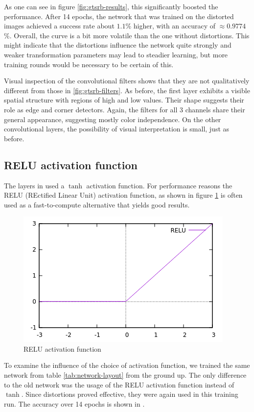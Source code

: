 \documentclass[11pt, a4paper]{article}
\begin{document}
As one can see in figure \ref{fig:gtsrb-results}, this significantly boosted the performance. After 14 epochs, the network that was trained on the distorted images achieved a success rate about $1.1$\% higher, with an accuracy of $\approx 0.9774$\%. Overall, the curve is a bit more volatile than the one without distortions. This might indicate that the distortions influence the network quite strongly and weaker transformation parameters may lead to steadier learning, but more training rounds would be necessary to be certain of this.

Visual inspection of the convolutional filters shows that they are not qualitatively different from those in \ref{fig:gtsrb-filters}. As before, the first layer exhibits a visible spatial structure with regions of high and low values. Their shape suggests their role as edge and corner detectors. Again, the filters for all 3 channels share their general appearance, suggesting mostly color independence. On the other convolutional layers, the possibility of visual interpretation is small, just as before.

\subsection{RELU activation function}
The layers in \cite{multi-column-neural-network-gtsrb} used a $\tanh$ activation function. For performance reasons the RELU (REctified Linear Unit) activation function, as shown in figure \ref{fig:relu} is often used as a fast-to-compute alternative that yields good results.

\begin{figure}[h!!!]
	\centering
	\includegraphics{images/relu}
	\caption{RELU activation function}
	\label{fig:relu}
\end{figure}

To examine the influence of the choice of activation function, we trained the same network from table \ref{tab:network-layout} from the ground up. The only difference to the old network was the usage of the RELU activation function instead of $\tanh$. Since distortions proved effective, they were again used in this training run. The accuracy over 14 epochs is shown in .
\end{document}
